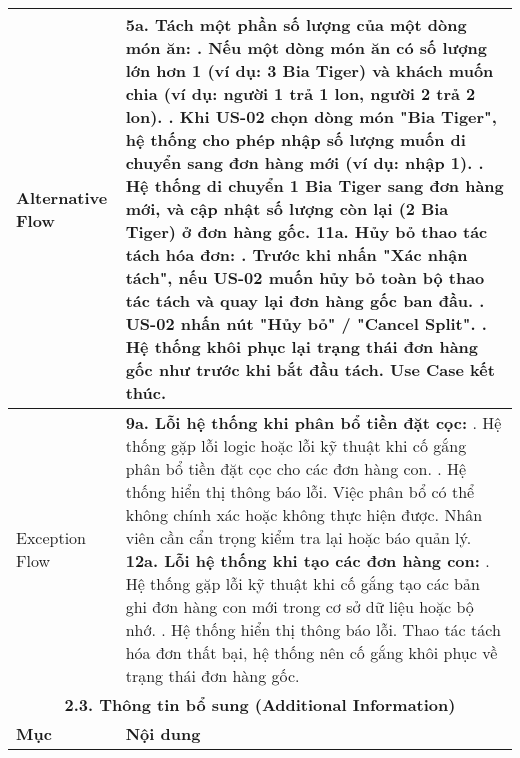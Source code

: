 \begin{longtable}{|m{4cm}|p{11cm}|}
\hline
Alternative Flow & \textbf{5a. Tách một phần số lượng của một dòng món ăn:} \newline    1. Nếu một dòng món ăn có số lượng lớn hơn 1 (ví dụ: 3 Bia Tiger) và khách muốn chia (ví dụ: người 1 trả 1 lon, người 2 trả 2 lon). \newline    2. Khi US-02 chọn dòng món "Bia Tiger", hệ thống cho phép nhập số lượng muốn di chuyển sang đơn hàng mới (ví dụ: nhập 1). \newline    3. Hệ thống di chuyển 1 Bia Tiger sang đơn hàng mới, và cập nhật số lượng còn lại (2 Bia Tiger) ở đơn hàng gốc. \newline \textbf{11a. Hủy bỏ thao tác tách hóa đơn:} \newline    1. Trước khi nhấn "Xác nhận tách", nếu US-02 muốn hủy bỏ toàn bộ thao tác tách và quay lại đơn hàng gốc ban đầu. \newline    2. US-02 nhấn nút "Hủy bỏ" / "Cancel Split". \newline    3. Hệ thống khôi phục lại trạng thái đơn hàng gốc như trước khi bắt đầu tách. Use Case kết thúc. \\
\hline
Exception Flow & \textbf{9a. Lỗi hệ thống khi phân bổ tiền đặt cọc:} \newline    1. Hệ thống gặp lỗi logic hoặc lỗi kỹ thuật khi cố gắng phân bổ tiền đặt cọc cho các đơn hàng con. \newline    2. Hệ thống hiển thị thông báo lỗi. Việc phân bổ có thể không chính xác hoặc không thực hiện được. Nhân viên cần cẩn trọng kiểm tra lại hoặc báo quản lý. \newline \textbf{12a. Lỗi hệ thống khi tạo các đơn hàng con:} \newline    1. Hệ thống gặp lỗi kỹ thuật khi cố gắng tạo các bản ghi đơn hàng con mới trong cơ sở dữ liệu hoặc bộ nhớ. \newline    2. Hệ thống hiển thị thông báo lỗi. Thao tác tách hóa đơn thất bại, hệ thống nên cố gắng khôi phục về trạng thái đơn hàng gốc. \\
\hline
\multicolumn{2}{|c|}{\textbf{2.3. Thông tin bổ sung (Additional Information)}} \\
\hline
\textbf{Mục} & \textbf{Nội dung} \\
\hline

\end{longtable}
